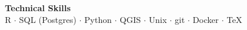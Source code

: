 \documentclass[letterpaper, onecolumn, oneside]{article}
\begin{document}

\begin{centering}

{\bf Technical Skills} \\
R $\cdot$ SQL (Postgres)  $\cdot$ Python  $\cdot$ QGIS   $\cdot$  Unix   $\cdot$  git   $\cdot$ Docker $\cdot$  \TeX \\  

\end{centering}
\end{document}
